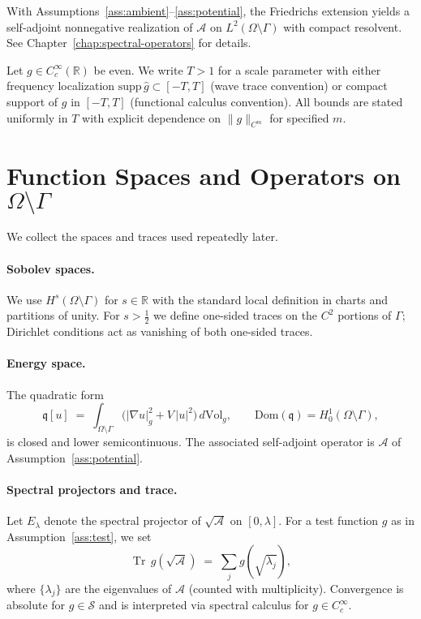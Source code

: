\begin{remark}
\label{rem:selfadjoint}
With Assumptions~\ref{ass:ambient}–\ref{ass:potential}, the Friedrichs
extension yields a self-adjoint nonnegative realization of $\mathcal{A}$ on
$L^2(\Omega\setminus\Gamma)$ with compact resolvent. See
Chapter~\ref{chap:spectral-operators} for details.
\end{remark}

\begin{assumption}
\label{ass:test}
Let $g\in C^\infty_c(\mathbb{R})$ be even. We write $T>1$ for a scale parameter
with either frequency localization $\mathrm{supp}\,\hat g \subset [-T,T]$ (wave
trace convention) or compact support of $g$ in $[-T,T]$ (functional calculus
convention). All bounds are stated uniformly in $T$ with explicit dependence on
$\|g\|_{C^{m}}$ for specified $m$.
\end{assumption}

\section{Function Spaces and Operators on $\Omega\setminus\Gamma$}
\label{sec:intro-spaces}

We collect the spaces and traces used repeatedly later.

\paragraph{Sobolev spaces.}
We use $H^s(\Omega\setminus\Gamma)$ for $s\in\mathbb{R}$ with the standard
local definition in charts and partitions of unity. For $s>\frac12$ we define
one-sided traces on the $C^{2}$ portions of $\Gamma$; Dirichlet conditions
act as vanishing of both one-sided traces.

\paragraph{Energy space.}
The quadratic form
\[
\mathfrak{q}[u] \;=\; \int_{\Omega\setminus\Gamma}\bigl( |\nabla u|_g^2 + V\,|u|^2 \bigr)\,d\mathrm{Vol}_g,
\qquad \mathrm{Dom}(\mathfrak{q}) = H^1_0(\Omega\setminus\Gamma),
\]
is closed and lower semicontinuous. The associated self-adjoint operator is
$\mathcal{A}$ of Assumption~\ref{ass:potential}.

\paragraph{Spectral projectors and trace.}
Let $E_\lambda$ denote the spectral projector of $\sqrt{\mathcal{A}}$ on
$[0,\lambda]$. For a test function $g$ as in Assumption~\ref{ass:test}, we set
\[
\operatorname{Tr}\,g(\sqrt{\mathcal{A}}) \;=\;
\sum_{j} g(\sqrt{\lambda_j}),
\]
where $\{\lambda_j\}$ are the eigenvalues of $\mathcal{A}$ (counted with multiplicity).
Convergence is absolute for $g\in\mathcal{S}$ and is interpreted via spectral calculus for
$g\in C^\infty_c$.


